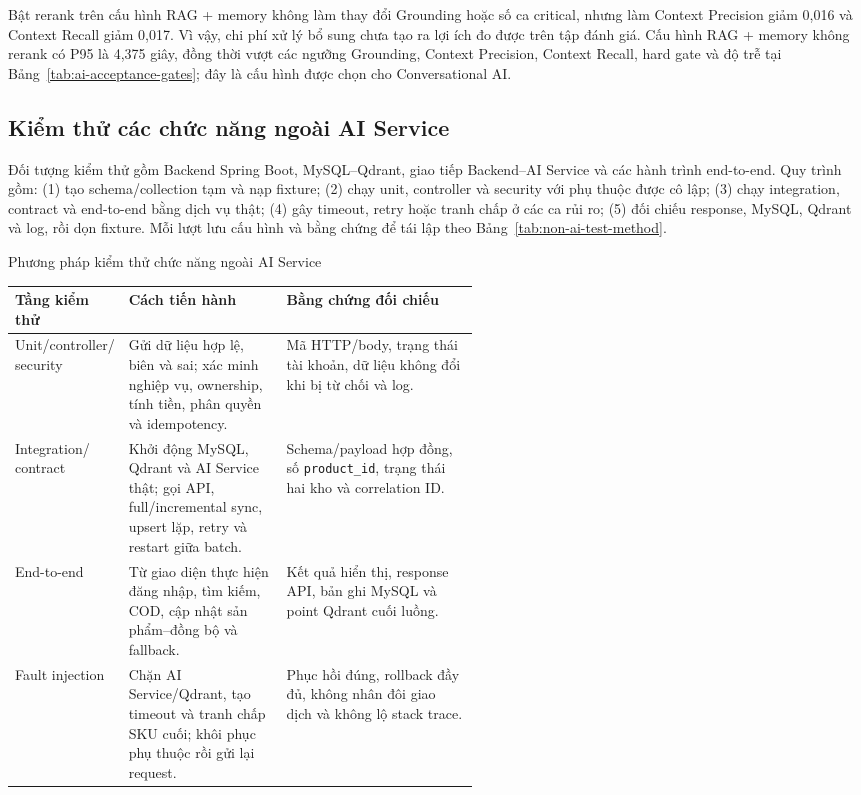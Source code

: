 Bật rerank trên cấu hình RAG + memory không làm thay đổi Grounding hoặc số ca critical, nhưng làm Context Precision giảm 0,016 và Context Recall giảm 0,017. Vì vậy, chi phí xử lý bổ sung chưa tạo ra lợi ích đo được trên tập đánh giá. Cấu hình RAG + memory không rerank có P95 là 4,375 giây, đồng thời vượt các ngưỡng Grounding, Context Precision, Context Recall, hard gate và độ trễ tại Bảng~\ref{tab:ai-acceptance-gates}; đây là cấu hình được chọn cho Conversational AI.

\endgroup

\subsection{Kiểm thử các chức năng ngoài AI Service}

Đối tượng kiểm thử gồm Backend Spring Boot, MySQL--Qdrant, giao tiếp Backend--AI Service và các hành trình end-to-end. Quy trình gồm: (1) tạo schema/collection tạm và nạp fixture; (2) chạy unit, controller và security với phụ thuộc được cô lập; (3) chạy integration, contract và end-to-end bằng dịch vụ thật; (4) gây timeout, retry hoặc tranh chấp ở các ca rủi ro; (5) đối chiếu response, MySQL, Qdrant và log, rồi dọn fixture. Mỗi lượt lưu cấu hình và bằng chứng để tái lập theo Bảng~\ref{tab:non-ai-test-method}.

\begingroup
\setlength{\tabcolsep}{3pt}
\renewcommand{\arraystretch}{0.90}
\begin{breakabletable}
\centering
\caption{Phương pháp kiểm thử chức năng ngoài AI Service}
\label{tab:non-ai-test-method}
\small
\begin{tabularx}{\linewidth}{|p{0.20\linewidth}|p{0.34\linewidth}|X|}
\hline
\textbf{Tầng kiểm thử} & \textbf{Cách tiến hành} & \textbf{Bằng chứng đối chiếu} \\ \hline
\makecell[l]{Unit/controller/\\security} & Gửi dữ liệu hợp lệ, biên và sai; xác minh nghiệp vụ, ownership, tính tiền, phân quyền và idempotency. & Mã HTTP/body, trạng thái tài khoản, dữ liệu không đổi khi bị từ chối và log. \\ \hline
\makecell[l]{Integration/\\contract} & Khởi động MySQL, Qdrant và AI Service thật; gọi API, full/incremental sync, upsert lặp, retry và restart giữa batch. & Schema/payload hợp đồng, số \texttt{product\_id}, trạng thái hai kho và correlation ID. \\ \hline
End-to-end & Từ giao diện thực hiện đăng nhập, tìm kiếm, COD, cập nhật sản phẩm--đồng bộ và fallback. & Kết quả hiển thị, response API, bản ghi MySQL và point Qdrant cuối luồng. \\ \hline
Fault injection & Chặn AI Service/Qdrant, tạo timeout và tranh chấp SKU cuối; khôi phục phụ thuộc rồi gửi lại request. & Phục hồi đúng, rollback đầy đủ, không nhân đôi giao dịch và không lộ stack trace. \\ \hline
\end{tabularx}
\end{breakabletable}

